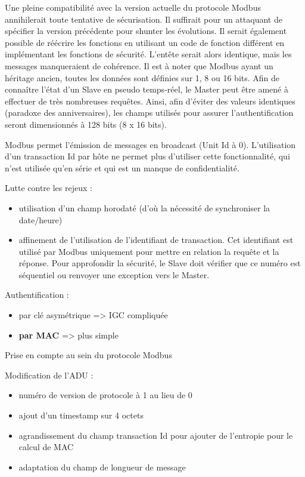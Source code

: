 \documentclass[10pt,a4paper]{article}
\begin{document}
	    Une pleine compatibilité avec la version actuelle du protocole Modbus annihilerait toute tentative de sécurisation. Il suffirait pour un attaquant de spécifier la version précédente pour shunter les évolutions.
        Il serait également possible de réécrire les fonctions en utilisant un code de fonction différent en implémentant les fonctions de sécurité. L'entête serait alors identique, mais les messages manqueraient de cohérence.	        
        Il est à noter que Modbus ayant un héritage ancien, toutes les données sont définies sur 1, 8 ou 16 bits. Afin de connaître l'état d'un Slave en pseudo temps-réel, le Master peut être amené à effectuer de très nombreuses requêtes. Ainsi, afin d'éviter des valeurs identiques (paradoxe des anniversaires), les champs utilisés pour assurer l'authentification seront dimensionnés à 128 bits (8 x 16 bits).
        
        Modbus permet l'émission de messages en broadcast (Unit Id à 0). L'utilisation d'un transaction Id par hôte ne permet plus d'utiliser cette fonctionnalité, qui n'est utilisée qu'en série et qui est un manque de confidentialité.
        
	    Lutte contre les rejeux : 
            \begin{itemize}
            \item utilisation d'un champ horodaté (d'où la nécessité de synchroniser la date/heure)
    	     \item affinement de l'utilisation de l'identifiant de transaction. Cet identifiant est utilisé par Modbus uniquement pour mettre en relation la requête et la réponse. Pour approfondir la sécurité, le Slave doit vérifier que ce numéro est séquentiel ou renvoyer une exception vers le Master.
    	     \end{itemize}            	        
	    
	    Authentification :
            \begin{itemize}
	        \item par clé asymétrique => IGC compliquée
	        \item \textbf{par MAC }=> plus simple
    	     \end{itemize}            	        
            
        Prise en compte au sein du protocole Modbus
        
            Modification de l'ADU :
            \begin{itemize}
            \item numéro de version de protocole à 1 au lieu de 0            
            \item ajout d'un timestamp sur 4 octets
            \item agrandissement du champ transaction Id pour ajouter de l'entropie pour le calcul de MAC
            \item adaptation du champ de longueur de message
    	     \end{itemize}            	        
       
\end{document}
